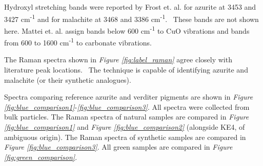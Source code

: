 Hydroxyl stretching bands were reported by Frost et. al. for azurite at 3453 and 3427 cm\textsuperscript{-1} and for malachite at 3468 and 3386 cm\textsuperscript{-1}.~\autocite{Frost} These bands are not shown here. Mattei et. al. assign bands below 600 cm\textsuperscript{-1} to CuO vibrations and bands from 600 to 1600 cm\textsuperscript{-1} to carbonate vibrations.~\autocite{Mattei}

The Raman spectra shown in \textit{Figure \ref{fig:label_raman}} agree closely with literature peak locations.~\autocite{Mattei,Frost,Bicchieri} The technique is capable of identifying azurite and malachite (or their synthetic analogues).

Spectra comparing reference azurite and verditer pigments are shown in \textit{Figure \ref{fig:blue_comparison1}}-\textit{\ref{fig:blue_comparison3}}. All spectra were collected from bulk particles. The Raman spectra of natural samples are compared in \textit{Figure \ref{fig:blue_comparison1}} and \textit{Figure \ref{fig:blue_comparison2}} (alongside KE4, of ambiguous origin). The Raman spectra of synthetic samples are compared in \textit{Figure \ref{fig:blue_comparison3}}. All green samples are compared in \textit{Figure \ref{fig:green_comparison}}.

